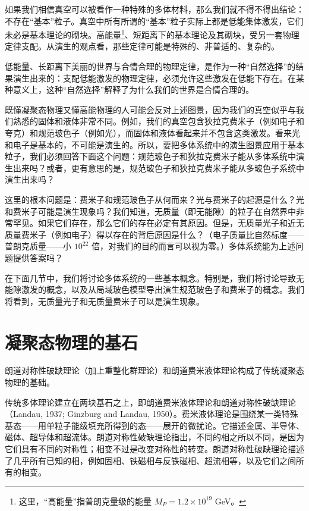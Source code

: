 如果我们相信真空可以被看作一种特殊的多体材料，那么我们就不得不得出结论：不存在“基本”粒子。真空中所有所谓的“基本”粒子实际上都是低能集体激发，它们未必是基本理论的砌块。高能量\footnote{这里，“高能量”指普朗克量级的能量 $M_P=1.2\times10^{19}$ GeV。}、短距离下的基本理论及其砌块，受另一套物理定律支配。从演生的观点看，那些定律可能是特殊的、非普适的、复杂的。

低能量、长距离下美丽的世界与合情合理的物理定律，是作为一种“自然选择”的结果演生出来的：支配低能激发的物理定律，必须允许这些激发在低能下存在。在某种意义上，这种“自然选择”解释了为什么我们的世界是合情合理的。

既懂凝聚态物理又懂高能物理的人可能会反对上述图景，因为我们的真空似乎与我们熟悉的固体和液体非常不同。例如，我们的真空包含狄拉克费米子（例如电子和夸克）和规范玻色子（例如光），而固体和液体看起来并不包含这类激发。看来光和电子是基本的，不可能是演生的。所以，要把多体系统中的演生图景应用于基本粒子，我们必须回答下面这个问题：规范玻色子和狄拉克费米子能从多体系统中演生出来吗？或者，更有意思的是，规范玻色子和狄拉克费米子能从多玻色子系统中演生出来吗？

这里的根本问题是：费米子和规范玻色子从何而来？光与费米子的起源是什么？光和费米子可能是演生现象吗？我们知道，无质量（即无能隙）的粒子在自然界中非常罕见。如果它们存在，那么它们的存在必定有其原因。但是，无质量光子和近无质量费米子（例如电子）得以存在的背后原因是什么？（电子质量比自然标度——普朗克质量——小 $10^{22}$ 倍，对我们的目的而言可以视为零。）多体系统能为上述问题提供答案吗？

在下面几节中，我们将讨论多体系统的一些基本概念。特别是，我们将讨论导致无能隙激发的概念，以及从局域玻色模型导出演生规范玻色子和费米子的概念。我们将看到，无质量光子和无质量费米子可以是演生现象。

\section{凝聚态物理的基石}

\begin{keypoints}
\item 朗道对称性破缺理论（加上重整化群理论）和朗道费米液体理论构成了传统凝聚态物理的基础。
\end{keypoints}

传统多体理论建立在两块基石之上，即朗道费米液体理论和朗道对称性破缺理论（Landau, 1937; Ginzburg and Landau, 1950）。费米液体理论是围绕某一类特殊基态——用单粒子能级填充所得到的态——展开的微扰论。它描述金属、半导体、磁体、超导体和超流体。朗道对称性破缺理论指出，不同的相之所以不同，是因为它们具有不同的对称性；相变不过是改变对称性的转变。朗道对称性破缺理论描述了几乎所有已知的相，例如固相、铁磁相与反铁磁相、超流相等，以及它们之间所有的相变。

